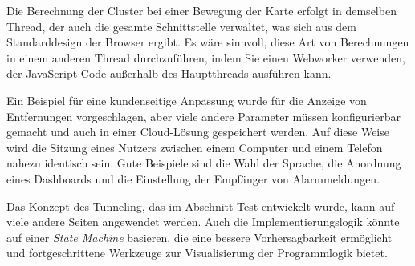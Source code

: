 Die Berechnung der Cluster bei einer Bewegung der Karte erfolgt in demselben Thread, der auch die gesamte Schnittstelle verwaltet, was sich aus dem Standarddesign der Browser ergibt.
Es wäre sinnvoll, diese Art von Berechnungen in einem anderen Thread durchzuführen, indem Sie einen Webworker verwenden, der JavaScript-Code außerhalb des Hauptthreads ausführen kann.

Ein Beispiel für eine kundenseitige Anpassung wurde für die Anzeige von Entfernungen vorgeschlagen, aber viele andere Parameter müssen konfigurierbar gemacht und auch in einer Cloud-Lösung gespeichert werden.
Auf diese Weise wird die Sitzung eines Nutzers zwischen einem Computer und einem Telefon nahezu identisch sein.
Gute Beispiele sind die Wahl der Sprache, die Anordnung eines Dashboards und die Einstellung der Empfänger von Alarmmeldungen.

Das Konzept des Tunneling, das im Abschnitt Test entwickelt wurde, kann auf viele andere Seiten angewendet werden.
Auch die Implementierungslogik könnte auf einer \textit{State Machine} basieren, die eine bessere Vorhersagbarkeit ermöglicht und fortgeschrittene Werkzeuge zur Visualisierung der Programmlogik bietet.
